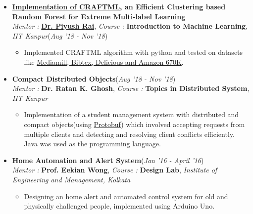 \documentclass[10pt]{extarticle}
\begin{document}
\begin{itemize}



\item \textbf{ \href{https://github.com/NirjharRoy/CRAFTML}{Implementation of CRAFTML}, an Efficient Clustering based Random Forest for Extreme Multi-label Learning} \\
{\textit{Mentor : }}\textbf{\href{https://www.cse.iitk.ac.in/users/piyush/}{Dr. Piyush Rai}}, \textit{{Course : }}\textbf{Introduction to Machine Learning}, \textit{IIT Kanpur}\hfill\hfill(\textit{Aug '18 - Nov '18})
\begin{itemize}
\item Implemented CRAFTML algorithm with python and tested on datasets like \href{http://manikvarma.org/downloads/XC/XMLRepository.html}{Mediamill, Bibtex, Delicious and Amazon 670K}.

\end{itemize}






\item \textbf{Compact Distributed Objects}\hfill\hfill(\textit{Aug '18 - Nov '18})\\{\textit{Mentor : }}\textbf{{Dr. Ratan K. Ghosh}}, \textit{{Course : }}\textbf{Topics in Distributed System}, \textit{IIT Kanpur}
\begin{itemize}
\item Implementation of a student management system with distributed and compact objects(using \href{https://developers.google.com/protocol-buffers}{Protobuf}) which involved accepting requests from multiple clients and detecting and resolving client conflicts efficiently. Java was used as the programming language.
\end{itemize}







\item \textbf{Home Automation and Alert System}\hfill\hfill(\textit{Jan '16 - April '16})\\{\textit{Mentor : }}\textbf{{Prof. Eekian Wong}}, \textit{{Course : }}\textbf{Design Lab}, \textit{Institute of Engineering and Management, Kolkata}
\begin{itemize}
\item Designing an home alert and automated control system for old and physically challenged people, implemented using Arduino Uno.
\end{itemize}




\end{itemize}
\end{document}
